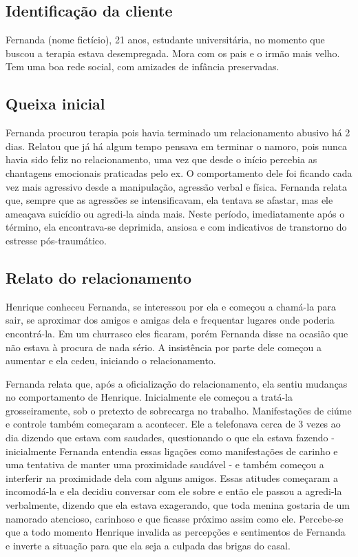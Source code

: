 \subsection*{Identificação da cliente}

Fernanda (nome fictício), 21 anos, estudante universitária, no momento que buscou a terapia estava desempregada. Mora com os pais e o irmão mais velho. Tem uma boa rede social, com amizades de infância preservadas. 

\subsection*{Queixa inicial}

Fernanda procurou terapia pois havia terminado um relacionamento abusivo há 2 dias. Relatou que já há algum tempo pensava em terminar o namoro, pois nunca havia sido feliz no relacionamento, uma vez que desde o início percebia as chantagens emocionais praticadas pelo ex. O comportamento dele foi ficando cada vez mais agressivo desde a manipulação, agressão verbal e física. Fernanda relata que, sempre que as agressões se intensificavam, ela tentava se afastar, mas ele ameaçava suicídio ou agredi-la ainda mais. Neste período, imediatamente após o término, ela encontrava-se deprimida, ansiosa e com indicativos de transtorno do estresse pós-traumático. 

\subsection*{Relato do relacionamento}

Henrique conheceu Fernanda, se interessou por ela e começou a chamá-la para sair, se aproximar dos amigos e amigas dela e frequentar lugares onde poderia encontrá-la. Em um churrasco eles ficaram, porém Fernanda disse na ocasião que não estava à procura de nada sério. A insistência por parte dele começou a aumentar e ela cedeu, iniciando o relacionamento.

Fernanda relata que, após a oficialização do relacionamento, ela sentiu mudanças no comportamento de Henrique. Inicialmente ele começou a tratá-la grosseiramente, sob o pretexto de sobrecarga no trabalho. Manifestações de ciúme e controle também começaram a acontecer. Ele a telefonava cerca de 3 vezes ao dia dizendo que estava com saudades, questionando o que ela estava fazendo - inicialmente Fernanda entendia essas ligações como manifestações de carinho e uma tentativa de manter uma proximidade saudável - e também começou a interferir na proximidade dela com alguns amigos. Essas atitudes começaram a incomodá-la e ela decidiu conversar com ele sobre e então ele passou a agredi-la verbalmente, dizendo que ela estava exagerando, que toda menina gostaria de um namorado atencioso, carinhoso e que ficasse próximo assim como ele. Percebe-se que a todo momento Henrique invalida as percepções e sentimentos de Fernanda e inverte a situação para que ela seja a culpada das brigas do casal.

